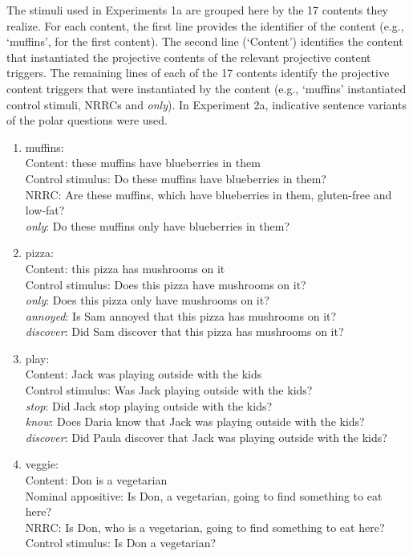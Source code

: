 \documentclass[11pt,fleqn]{article}
\newcommand{\6}{\mbox{$[\hspace*{-.6mm}[$}}
\newcommand{\9}{\mbox{$]\hspace*{-.6mm}]$}}
\begin{document}
The stimuli used in Experiments 1a are grouped here by the 17 contents they realize. For each content, the first line provides the identifier of the content (e.g., `muffins', for the first content). The second line (`Content') identifies the content that instantiated the projective contents of the relevant projective content triggers. The remaining lines of each of the 17 contents identify the projective content triggers that were instantiated by the content (e.g., `muffins' instantiated control stimuli, NRRCs and {\em only}). In Experiment 2a, indicative sentence variants of the polar questions were used.

\begin{enumerate}

\item  muffins:  \\
     Content: these muffins have blueberries in them\\
     Control stimulus: Do these muffins have blueberries in them?\\
     NRRC: Are these muffins, which have blueberries in them, gluten-free and low-fat?\\
     {\em only}: Do these muffins only have blueberries in them?

\item pizza:  \\
     Content: this pizza has mushrooms on it\\
     Control stimulus: Does this pizza have mushrooms on it?\\
     {\em only}: Does this pizza only have mushrooms on it?\\
     {\em annoyed}: Is Sam annoyed that this pizza has mushrooms on it?\\
     {\em discover}: Did Sam discover that this pizza has mushrooms on it?

\item play:  \\
     Content: Jack was playing outside with the kids\\
     Control stimulus: Was Jack playing outside with the kids?\\
     {\em stop}: Did Jack stop playing outside with the kids?\\
     {\em know}: Does Daria know that Jack was playing outside with the kids?\\
     {\em discover}: Did Paula discover that Jack was playing outside with the kids?

\item veggie:  \\
     Content: Don is a vegetarian\\
     Nominal appositive: Is Don, a vegetarian, going to find something to eat here?\\
     NRRC: Is Don, who is a vegetarian, going to find something to eat here?\\
     Control stimulus: Is Don a vegetarian?


\end{enumerate}
\end{document}
